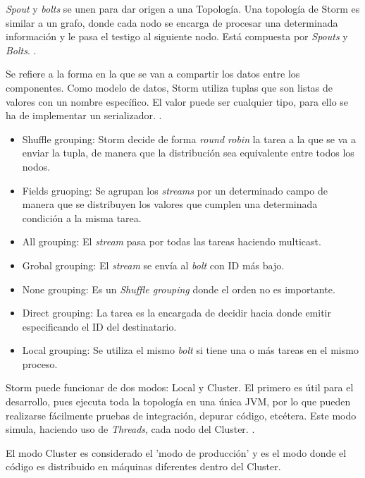 \textit{Spout} y \textit{bolts} se unen para dar origen a una Topología. Una topología de Storm es similar a un grafo, donde cada nodo se encarga de procesar una determinada información y le pasa el testigo al siguiente nodo. Está compuesta por \textit{Spouts} y \textit{Bolts}. \cite{Storm}.

Se refiere a la forma en la que se van a compartir los datos entre los componentes. Como modelo de datos, Storm utiliza tuplas que son listas de valores con un nombre específico. El valor puede ser cualquier tipo, para ello se ha de implementar un serializador. \cite{Storm}.

\begin{itemize}
\item Shuffle grouping: Storm decide de forma \textit{round robin} la tarea a la que se va a enviar la tupla, de manera que la distribución sea equivalente entre todos los nodos.
\item Fields gruoping: Se agrupan los \textit{streams} por un determinado campo de manera que se distribuyen los valores que cumplen una determinada condición a la misma tarea.
\item All grouping: El \textit{stream} pasa por todas las tareas haciendo multicast.
\item Grobal grouping: El \textit{stream} se envía al \textit{bolt} con ID más bajo.
\item None grouping: Es un \textit{Shuffle grouping} donde el orden no es importante.
\item Direct grouping: La tarea es la encargada de decidir hacia donde emitir especificando el ID del destinatario.
\item Local grouping: Se utiliza el mismo \textit{bolt} si tiene una o más tareas en el mismo proceso.
\end{itemize}

Storm puede funcionar de dos modos: Local y Cluster. El primero es útil para el desarrollo, pues ejecuta toda la topología en una única JVM, por lo que pueden realizarse fácilmente pruebas de integración, depurar código, etcétera. Este modo simula, haciendo uso de \textit{Threads}, cada nodo del Cluster. \cite{Storm}.

El modo Cluster es considerado el 'modo de producción' y es el modo donde el código es distribuido en máquinas diferentes dentro del Cluster.

